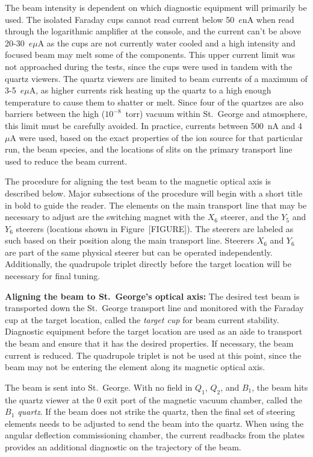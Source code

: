 The beam intensity is dependent on which diagnostic equipment will
primarily be used. The isolated Faraday cups cannot read current below
50~$e$nA when read through the logarithmic amplifier at the console, and
the current can't be above 20-30~$e\mu$A as the cups are not currently
water cooled and a high intensity and focused beam may melt some of the
components. This upper current limit was not approached during the
tests, since the cups were used in tandem with the quartz viewers. The
quartz viewers are limited to beam currents of a maximum of 3-5~$e\mu$A,
as higher currents risk heating up the quartz to a high enough
temperature to cause them to shatter or melt. Since four of the quartzes
are also barriers between the high ($10^{-8}$~torr) vacuum within St.\
George and atmosphere, this limit must be carefully avoided. In
practice, currents between 500~nA and 4~$\mu$A were used, based on the
exact properties of the ion source for that particular run, the beam
species, and the locations of slits on the primary transport line used
to reduce the beam current.

The procedure for aligning the test beam to the magnetic optical axis is
described below. Major subsections of the procedure will begin with a
short title in bold to guide the reader. The elements on the main
transport line that may be necessary to adjust are the switching magnet
with the $X_6$ steerer, and the $Y_5$ and $Y_6$ steerers (locations
shown in Figure~[FIGURE]). The steerers are labeled as such based on
their position along the main transport line. Steerers $X_6$ and $Y_6$
are part of the same physical steerer but can be operated independently.
Additionally, the quadrupole triplet directly before the target location
will be necessary for final tuning.

\textbf{Aligning the beam to St.\ George's optical axis:}
The desired test beam is transported down the St.\ George transport line
and monitored with the Faraday cup at the target location, called the
\emph{target cup} for beam current stability. Diagnostic equipment
before the target location are used as an aide to transport the beam and
ensure that it has the desired properties. If necessary, the beam
current is reduced. The quadrupole triplet is not be used at this point,
since the beam may not be entering the element along its magnetic
optical axis.

The beam is sent into St.\ George. With no field in $Q_1$, $Q_2$, and
$B_1$, the beam hits the quartz viewer at the 0\degree{} exit port of
the magnetic vacuum chamber, called the \emph{$B_1$ quartz}. If the beam
does not strike the quartz, then the final set of steering elements
needs to be adjusted to send the beam into the quartz. When using the
angular deflection commissioning chamber, the current readbacks from the
plates provides an additional diagnostic on the trajectory of the beam.

